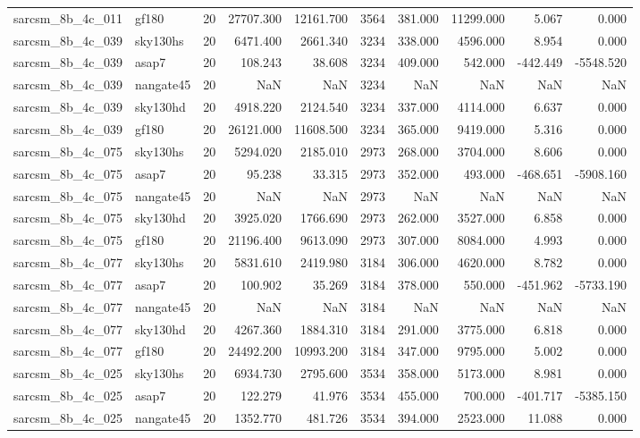\begin{longtable}{llrrrrrrrr}
sarcsm\_8b\_4c\_011 & gf180 & 20 & 27707.300 & 12161.700 & 3564 & 381.000 & 11299.000 & 5.067 & 0.000 \\
sarcsm\_8b\_4c\_039 & sky130hs & 20 & 6471.400 & 2661.340 & 3234 & 338.000 & 4596.000 & 8.954 & 0.000 \\
sarcsm\_8b\_4c\_039 & asap7 & 20 & 108.243 & 38.608 & 3234 & 409.000 & 542.000 & -442.449 & -5548.520 \\
sarcsm\_8b\_4c\_039 & nangate45 & 20 & NaN & NaN & 3234 & NaN & NaN & NaN & NaN \\
sarcsm\_8b\_4c\_039 & sky130hd & 20 & 4918.220 & 2124.540 & 3234 & 337.000 & 4114.000 & 6.637 & 0.000 \\
sarcsm\_8b\_4c\_039 & gf180 & 20 & 26121.000 & 11608.500 & 3234 & 365.000 & 9419.000 & 5.316 & 0.000 \\
sarcsm\_8b\_4c\_075 & sky130hs & 20 & 5294.020 & 2185.010 & 2973 & 268.000 & 3704.000 & 8.606 & 0.000 \\
sarcsm\_8b\_4c\_075 & asap7 & 20 & 95.238 & 33.315 & 2973 & 352.000 & 493.000 & -468.651 & -5908.160 \\
sarcsm\_8b\_4c\_075 & nangate45 & 20 & NaN & NaN & 2973 & NaN & NaN & NaN & NaN \\
sarcsm\_8b\_4c\_075 & sky130hd & 20 & 3925.020 & 1766.690 & 2973 & 262.000 & 3527.000 & 6.858 & 0.000 \\
sarcsm\_8b\_4c\_075 & gf180 & 20 & 21196.400 & 9613.090 & 2973 & 307.000 & 8084.000 & 4.993 & 0.000 \\
sarcsm\_8b\_4c\_077 & sky130hs & 20 & 5831.610 & 2419.980 & 3184 & 306.000 & 4620.000 & 8.782 & 0.000 \\
sarcsm\_8b\_4c\_077 & asap7 & 20 & 100.902 & 35.269 & 3184 & 378.000 & 550.000 & -451.962 & -5733.190 \\
sarcsm\_8b\_4c\_077 & nangate45 & 20 & NaN & NaN & 3184 & NaN & NaN & NaN & NaN \\
sarcsm\_8b\_4c\_077 & sky130hd & 20 & 4267.360 & 1884.310 & 3184 & 291.000 & 3775.000 & 6.818 & 0.000 \\
sarcsm\_8b\_4c\_077 & gf180 & 20 & 24492.200 & 10993.200 & 3184 & 347.000 & 9795.000 & 5.002 & 0.000 \\
sarcsm\_8b\_4c\_025 & sky130hs & 20 & 6934.730 & 2795.600 & 3534 & 358.000 & 5173.000 & 8.981 & 0.000 \\
sarcsm\_8b\_4c\_025 & asap7 & 20 & 122.279 & 41.976 & 3534 & 455.000 & 700.000 & -401.717 & -5385.150 \\
sarcsm\_8b\_4c\_025 & nangate45 & 20 & 1352.770 & 481.726 & 3534 & 394.000 & 2523.000 & 11.088 & 0.000 \\

\end{longtable}
